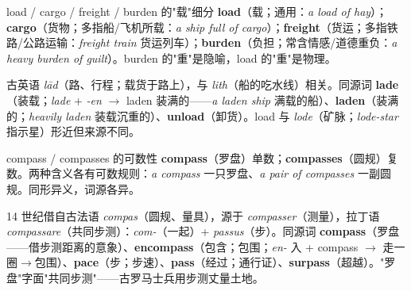 \documentclass[../main.tex]{subfiles}
\begin{document}


\begin{gram}{load / cargo / freight / burden 的"载"细分}
\textbf{load}（载；通用：\textit{a load of hay}）；\textbf{cargo}（货物；多指船/飞机所载：\textit{a ship full of cargo}）；\textbf{freight}（货运；多指铁路/公路运输：\textit{freight train} 货运列车）；\textbf{burden}（负担；常含情感/道德重负：\textit{a heavy burden of guilt}）。burden 的"重"是隐喻，load 的"重"是物理。
\end{gram}

\begin{origin}
古英语 \textit{lād}（路、行程；载货于路上），与 \textit{lith}（船的吃水线）相关。同源词 \textbf{lade}（装载；\textit{lade} + \textit{-en} $\to$ laden 装满的——\textit{a laden ship} 满载的船）、\textbf{laden}（装满的；\textit{heavily laden} 装载沉重的）、\textbf{unload}（卸货）。load 与 \textit{lode}（矿脉；\textit{lode-star} 指示星）形近但来源不同。
\end{origin}




\begin{gram}{compass / compasses 的可数性}
\textbf{compass}（罗盘）单数；\textbf{compasses}（圆规）复数。两种含义各有可数规则：\textit{a compass} 一只罗盘、\textit{a pair of compasses} 一副圆规。同形异义，词源各异。
\end{gram}

\begin{origin}
14 世纪借自古法语 \textit{compas}（圆规、量具），源于 \textit{compasser}（测量），拉丁语 \textit{compassare}（共同步测）：\textit{com-}（一起）+ \textit{passus}（步）。同源词 \textbf{compass}（罗盘——借步测距离的意象）、\textbf{encompass}（包含；包围；\textit{en-} 入 + compass $\to$ 走一圈$\to$包围）、\textbf{pace}（步；步速）、\textbf{pass}（经过；通行证）、\textbf{surpass}（超越）。"罗盘"字面"共同步测"——古罗马士兵用步测丈量土地。
\end{origin}
\end{document}
